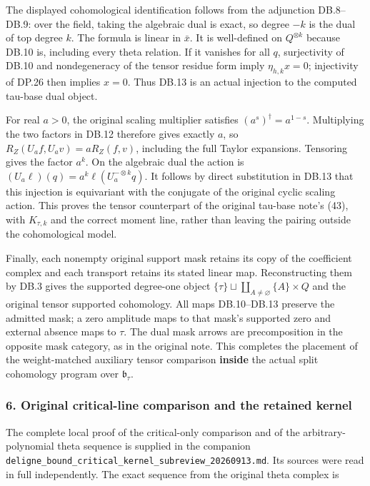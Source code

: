 The displayed cohomological identification follows from the adjunction DB.8--DB.9: over the field, taking the algebraic dual is exact, so degree \(-k\) is the dual of top degree \(k\). The formula is linear in \(\bar x\). It is well-defined on \(Q^{\otimes k}\) because DB.10 is, including every theta relation. If it vanishes for all \(q\), surjectivity of DB.10 and nondegeneracy of the tensor residue form imply \(\eta_{h,k}x=0\); injectivity of DP.26 then implies \(x=0\). Thus DB.13 is an actual injection to the computed tau-base dual object.

For real \(a>0\), the original scaling multiplier satisfies \((a^s)^\dagger=a^{1-s}\). Multiplying the two factors in DB.12 therefore gives exactly \(a\), so \(R_Z(U_af,U_av)=aR_Z(f,v)\), including the full Taylor expansions. Tensoring gives the factor \(a^k\). On the algebraic dual the action is \((U_a\ell)(q)=a^k\ell(U_a^{-\otimes k}q)\). It follows by direct substitution in DB.13 that this injection is equivariant with the conjugate of the original cyclic scaling action. This proves the tensor counterpart of the original tau-base note's (43), with \(K_{\tau,k}\) and the correct moment line, rather than leaving the pairing outside the cohomological model.

Finally, each nonempty original support mask retains its copy of the coefficient complex and each transport retains its stated linear map. Reconstructing them by DB.3 gives the supported degree-one object \(\{\tau\}\sqcup\coprod_{A\ne\varnothing}\{A\}\times Q\) and the original tensor supported cohomology. All maps DB.10--DB.13 preserve the admitted mask; a zero amplitude maps to that mask's supported zero and external absence maps to \(\tau\). The dual mask arrows are precomposition in the opposite mask category, as in the original note. This completes the placement of the weight-matched auxiliary tensor comparison \textbf{inside} the actual split cohomology program over \(\mathfrak b_\tau\).

\subsubsection{6. Original critical-line comparison and the retained kernel}\label{endpoint-purity_review--original-critical-line-comparison-and-the-retained-kernel}

The complete local proof of the critical-only comparison and of the arbitrary-polynomial theta sequence is supplied in the companion \nolinkurl{deligne_bound_critical_kernel_subreview_20260913.md}. Its sources were read in full independently. The exact sequence from the original theta complex is

